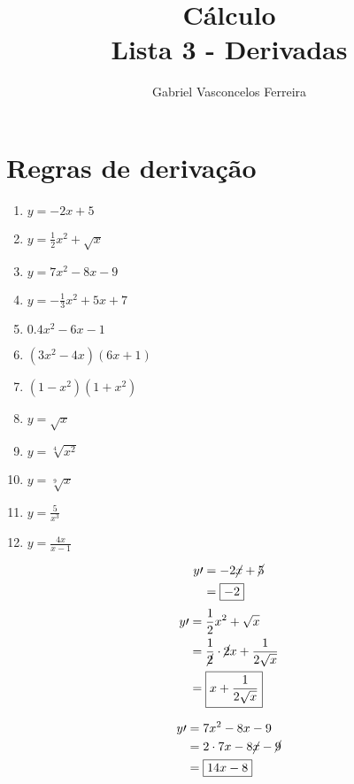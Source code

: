 \documentclass{jhwhw}
\title{Cálculo\\Lista 3 - Derivadas}
\author{Gabriel Vasconcelos Ferreira}
\begin{document}
\maketitle
\chapter{Regras de derivação}
\begin{multicols}{3}[]
    \begin{enumerate}
        \item $y = -2x + 5$
        \item $y = \frac{1}{2}x^2 + \sqrt{x}$
        \item $y = 7x^2- 8x - 9$
        \item $y = -\frac{1}{3} x^2 + 5x + 7$
        \item $0.4 x^2 -6x -1$
        \item $(3x^2 - 4x)(6x+1)$
        \item $(1-x^2)(1+x^2)$
        \item $y = \sqrt{x}$
        \item $y = \sqrt[4]{x^2}$
        \item $y = \sqrt[9]{x}$
        \item $y = \frac{5}{x^3}$
        \item $y = \frac{4x}{x-1}$
    \end{enumerate}
\end{multicols}
\begin{align*}
    y\prime & = -2\cancel{x} + \cancel{5} \\
            & = \boxed{-2}                \\
\end{align*}
\begin{align*}
    y\prime & = \frac{1}{2}x^2 + \sqrt{x}                                    \\
            & = \frac{1}{\cancel{2}} \cdot \cancel{2}x + \frac{1}{2\sqrt{x}} \\
            & = \boxed{x + \frac{1}{2\sqrt{x}}}
\end{align*}

\begin{align*}
    y\prime & = 7x^2- 8x - 9                        \\
            & = 2\cdot7x - 8\cancel{x} - \cancel{9} \\
            & = \boxed{14x - 8}
\end{align*}
\end{document}
